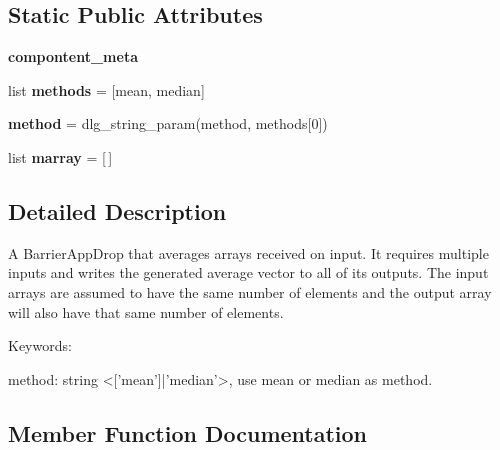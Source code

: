 \subsection*{Static Public Attributes}
\begin{DoxyCompactItemize}
\item 
{\bfseries compontent\+\_\+meta}
\item 
\mbox{\label{classdlg_1_1apps_1_1simple_1_1_average_arrays_app_a2b7d9a8be50acfe28cc0b8abe098e143}} 
list {\bfseries methods} = \mbox{[}\textquotesingle{}mean\textquotesingle{}, \textquotesingle{}median\textquotesingle{}\mbox{]}
\item 
\mbox{\label{classdlg_1_1apps_1_1simple_1_1_average_arrays_app_a5cd39fb9ca51c0a4d4b7b555c09258c1}} 
{\bfseries method} = dlg\+\_\+string\+\_\+param(\textquotesingle{}method\textquotesingle{}, methods\mbox{[}0\mbox{]})
\item 
\mbox{\label{classdlg_1_1apps_1_1simple_1_1_average_arrays_app_ad10cd5d6580744ad9e1901866c419c40}} 
list {\bfseries marray} = \mbox{[}$\,$\mbox{]}
\end{DoxyCompactItemize}


\subsection{Detailed Description}
\begin{DoxyVerb}A BarrierAppDrop that averages arrays received on input. It requires
multiple inputs and writes the generated average vector to all of its
outputs.
The input arrays are assumed to have the same number of elements and
the output array will also have that same number of elements.

Keywords:

method:  string <['mean']|'median'>, use mean or median as method.
\end{DoxyVerb}
 

\subsection{Member Function Documentation}
\mbox{\label{classdlg_1_1apps_1_1simple_1_1_average_arrays_app_ae0c6c4db425f36093fc053ed75a9db16}} 
